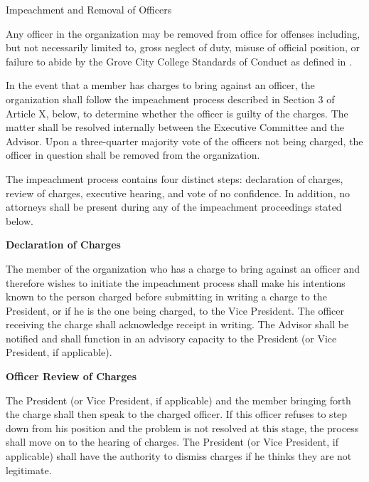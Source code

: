 {
\begin{article}{Impeachment and Removal of Officers}
	\item Any officer in the organization may be removed from office for offenses including, but not necessarily limited to, gross neglect of duty, misuse of official position, or failure to abide by the Grove City College Standards of Conduct as defined in \crimson.
	\item In the event that a member has charges to bring against an officer, the organization shall follow the impeachment process described in Section 3 of Article X, below, to determine whether the officer is guilty of the charges. The matter shall be resolved internally between the Executive Committee and the Advisor. Upon a three-quarter majority vote of the officers not being charged, the officer in question shall be removed from the organization.
	\item The impeachment process contains four distinct steps: declaration of charges, review of charges, executive hearing, and vote of no confidence.  In addition, no attorneys shall be present during any of the impeachment proceedings stated below.

	\hypertarget{Declaration of Charges}{}
	\textbf{Declaration of Charges}

	The member of the organization who has a charge to bring against an officer and therefore wishes to initiate the impeachment process shall make his intentions known to the person charged before submitting in writing a charge to the President, or if he is the one being charged, to the Vice President. The officer receiving the charge shall acknowledge receipt in writing. The Advisor shall be notified and shall function in an advisory capacity to the President (or Vice President, if applicable).

	\hypertarget{Officer Review of Charges}{}
	\textbf{Officer Review of Charges}

	The President (or Vice President, if applicable) and the member bringing forth the charge shall then speak to the charged officer. If this officer refuses to step down from his position and the problem is not resolved at this stage, the process shall move on to the hearing of charges. The President (or Vice President, if applicable) shall have the authority to dismiss charges if he thinks they are not legitimate.


\end{article}}
